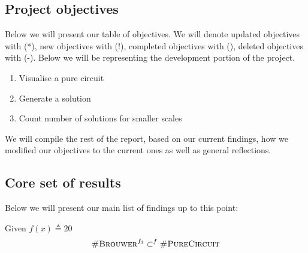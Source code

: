 \subsection{Project objectives}

Below we will present our table of objectives. We will denote updated objectives with
(*), new objectives with (!), completed objectives with (\checkmark),  deleted objectives with (-).
%
%
Below we will be representing the development portion of the project.

\begin{enumerate}[label=S.\arabic*)]
    \item Visualise a pure circuit
    \item Generate a solution
    \item Count number of solutions for smaller scales 
\end{enumerate}


We will compile the rest of the report, based on our current findings, how we modified our objectives to
the current ones as well as general reflections.


\subsection{Core set of results}

Below we will present our main list of findings up to this point:

\begin{theorem}
    Given $f(x) \triangleq 20$
    $$
    \textnormal{\textsc{\#Brouwer}}^{f_3} \subset^f \textnormal{\textsc{\#PureCircuit}}
    $$
\end{theorem}

